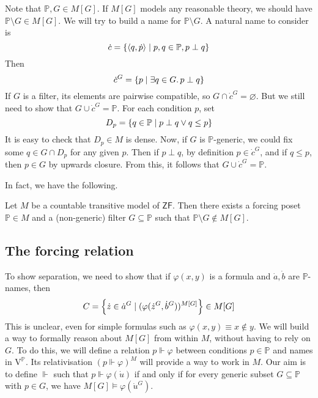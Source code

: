\begin{example}
    Note that \( \mathbb P, G \in M[G] \).
    If \( M[G] \) models any reasonable theory, we should have \( \mathbb P \setminus G \in M[G] \).
    We will try to build a name for \( \mathbb P \setminus G \).
    A natural name to consider is
    \[ \dot c = \qty{\langle q, \dot p \rangle \mid p, q \in \mathbb P, p \perp q} \]
    Then
    \[ \dot c^G = \qty{p \mid \exists q \in G.\, p \perp q} \]
    If \( G \) is a filter, its elements are pairwise compatible, so \( G \cap \dot c^G = \varnothing \).
    But we still need to show that \( G \cup \dot c^G = \mathbb P \).
    For each condition \( p \), set
    \[ D_p = \qty{q \in \mathbb P \mid p \perp q \vee q \leq p} \]
    It is easy to check that \( D_p \in M \) is dense.
    Now, if \( G \) is \( \mathbb P \)-generic, we could fix some \( q \in G \cap D_p \) for any given \( p \).
    Then if \( p \perp q \), by definition \( p \in \dot c^G \), and if \( q \leq p \), then \( p \in G \) by upwards closure.
    From this, it follows that \( G \cup \dot c^G = \mathbb P \).
\end{example}
In fact, we have the following.
\begin{proposition}
    Let \( M \) be a countable transitive model of \( \mathsf{ZF} \).
    Then there exists a forcing poset \( \mathbb P \in M \) and a (non-generic) filter \( G \subseteq \mathbb P \) such that \( \mathbb P \setminus G \notin M[G] \).
\end{proposition}

\subsection{The forcing relation}
To show separation, we need to show that if \( \varphi(x, y) \) is a formula and \( \dot a, \dot b \) are \( \mathbb P \)-names, then
\[ C = \qty{\dot z \in \dot a^G \mid (\varphi(\dot z^G, \dot b^G))^{M[G]}} \in M[G] \]
This is unclear, even for simple formulas such as \( \varphi(x, y) \equiv x \notin y \).
We will build a way to formally reason about \( M[G] \) from within \( M \), without having to rely on \( G \).
To do this, we will define a relation \( p \Vdash \varphi \) between conditions \( p \in \mathbb P \) and names in \( \mathrm{V}^{\mathbb P} \).
Its relativisation \( (p \Vdash \varphi)^M \) will provide a way to work in \( M \).
Our aim is to define \( \Vdash \) such that \( p \Vdash \varphi(\dot u) \) if and only if for every generic subset \( G \subseteq \mathbb P \) with \( p \in G \), we have \( M[G] \vDash \varphi(\dot u^G) \).


